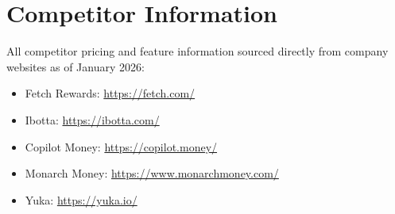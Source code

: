 \documentclass[11pt,a4paper]{report}
\begin{document}
\section{Competitor Information}

All competitor pricing and feature information sourced directly from company websites as of January 2026:
\begin{itemize}[leftmargin=2em, itemsep=2pt]
    \item Fetch Rewards: \url{https://fetch.com/}
    \item Ibotta: \url{https://ibotta.com/}
    \item Copilot Money: \url{https://copilot.money/}
    \item Monarch Money: \url{https://www.monarchmoney.com/}
    \item Yuka: \url{https://yuka.io/}
\end{itemize}

\vspace{1cm}
\end{document}
